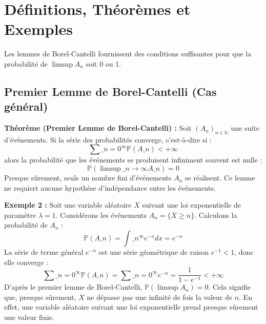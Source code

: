 \documentclass[11pt,a4paper]{article}
\begin{document}


\section{Définitions, Théorèmes et Exemples}

Les lemmes de Borel-Cantelli fournissent des conditions suffisantes pour que la probabilité de $\limsup A_n$ soit 0 ou 1.

\subsection{Premier Lemme de Borel-Cantelli (Cas général)}

\textbf{Théorème (Premier Lemme de Borel-Cantelli) :}
Soit $(A_n)_{n \in \mathbb{N}}$ une suite d'événements. Si la série des probabilités converge, c'est-à-dire si :
$$ \sum\_{n=0}^\infty \mathbb{P}(A\_n) < +\infty $$
alors la probabilité que les événements se produisent infiniment souvent est nulle :
$$ \mathbb{P}\left(\limsup\_{n \to \infty} A\_n\right) = 0 $$
Presque sûrement, seuls un nombre fini d'événements $A_n$ se réalisent. Ce lemme ne requiert aucune hypothèse d'indépendance entre les événements.

\textbf{Exemple 2 :}
Soit une variable aléatoire $X$ suivant une loi exponentielle de paramètre $\lambda = 1$. Considérons les événements $A_n = \{X \ge n\}$.
Calculons la probabilité de $A_n$ :
$$ \mathbb{P}(A\_n) = \int\_n^\infty e^{-x} dx = e^{-n} $$
La série de terme général $e^{-n}$ est une série géométrique de raison $e^{-1} < 1$, donc elle converge :
$$ \sum\_{n=0}^\infty \mathbb{P}(A\_n) = \sum\_{n=0}^\infty e^{-n} = \frac{1}{1 - e^{-1}} < +\infty $$
D'après le premier lemme de Borel-Cantelli, $\mathbb{P}(\limsup A_n) = 0$.
Cela signifie que, presque sûrement, $X$ ne dépasse pas une infinité de fois la valeur de $n$. En effet, une variable aléatoire suivant une loi exponentielle prend presque sûrement une valeur finie.
\end{document}
